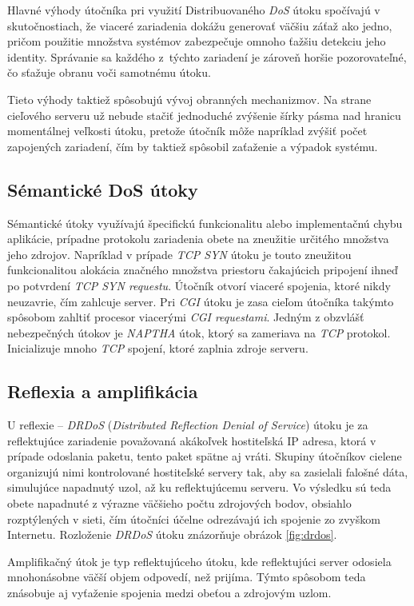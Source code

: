 \documentclass[
  digital, %
  table,   %
  lof,     %
  nolot,   %
  nocover
]{fithesis3}
\begin{document}
Hlavné výhody útočníka pri využití Distribuovaného \textit{DoS} útoku
spočívajú v skutočnostiach, že viaceré zariadenia dokážu generovať väčšiu záťaž ako jedno,
pričom použitie množstva systémov zabezpečuje omnoho ťažšiu detekciu jeho identity. Správanie
sa každého z~týchto zariadení je zároveň horšie pozorovateľné, čo sťažuje obranu voči samotnému útoku.

Tieto výhody taktiež spôsobujú vývoj obranných mechanizmov. Na strane cieľového serveru už
nebude stačiť jednoduché zvýšenie šírky pásma nad hranicu momentálnej veľkosti útoku, pretože
útočník môže napríklad zvýšiť počet zapojených zariadení, čím by taktiež spôsobil zaťaženie a
výpadok systému.

\subsection{Sémantické DoS útoky}
Sémantické útoky využívajú špecifickú funkcionalitu alebo implementačnú chybu aplikácie,
prípadne protokolu zariadenia obete na zneužitie určitého množstva jeho zdrojov. Napríklad
v prípade \textit{TCP SYN} útoku je touto zneužitou funkcionalitou alokácia značného množstva
priestoru čakajúcich pripojení ihneď po potvrdení \textit{ TCP SYN requestu}. Útočník otvorí
viaceré spojenia, ktoré nikdy neuzavrie, čím zahlcuje server. 
Pri \textit{CGI} útoku je zasa cieľom útočníka takýmto spôsobom zahltiť procesor viacerými
\textit{CGI requestami}.
Jedným z obzvlášť nebezpečných útokov je \textit{NAPTHA} útok, ktorý sa zameriava na
\textit{TCP} protokol. Inicializuje mnoho \textit{TCP} spojení, ktoré zaplnia zdroje serveru.

\subsection{Reflexia a amplifikácia}
U reflexie -- \textit{DRDoS} (\textit{Distributed Reflection Denial of Service})
útoku je za reflektujúce zariadenie považovaná akákoľvek hostiteľská IP adresa, 
ktorá v prípade odoslania
paketu, tento paket spätne aj vráti.
Skupiny útočníkov cielene organizujú nimi kontrolované hostiteľské servery tak, aby sa zasielali 
falošné dáta, simulujúce napadnutý uzol, až ku reflektujúcemu serveru. Vo výsledku sú teda obete 
napadnuté z výrazne väčšieho počtu zdrojových bodov, obsiahlo rozptýlených v sieti, čím útočníci účelne 
odrezávajú ich spojenie zo zvyškom Internetu. Rozloženie \textit{DRDoS} útoku znázorňuje obrázok \ref{fig:drdos}.

Amplifikačný útok je typ reflektujúceho útoku, kde reflektujúci server odosiela mnohonásobne väčší 
objem odpovedí, než prijíma. Týmto spôsobom teda znásobuje aj vyťaženie spojenia medzi obeťou a 
zdrojovým uzlom.
\end{document}
